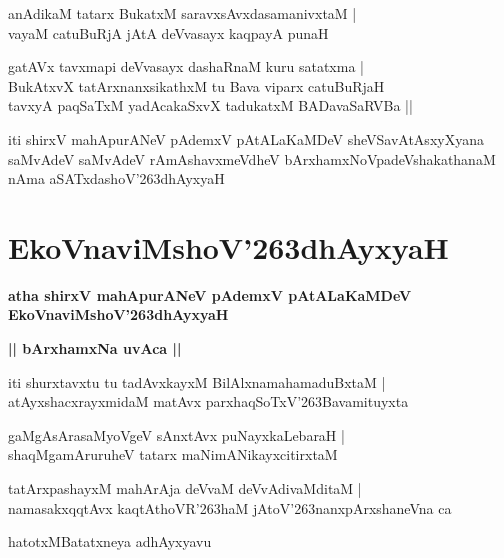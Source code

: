 \documentclass[twoside,12pt,openright]{book}
\def\S{\char'263}
\newcounter{shloka}[chapter]
\def\uvaca#1{\centerline{{\large\textbf{#1}}}}
\begin{document}
\begin{shloka}%
anAdikaM tatarx BukatxM saravxsAvxdasamanivxtaM |\\
vayaM catuBuRjA jAtA deVvasayx kaqpayA punaH 
\end{shloka}

\begin{shloka}%
gatAVx tavxmapi deVvasayx dashaRnaM kuru satatxma |\\
BukAtxvX tatArxnanxsikathxM tu Bava viparx catuBuRjaH \\
tavxyA paqSaTxM yadAcakaSxvX tadukatxM BADavaSaRVBa ||\\
\end{shloka}

\begin{center}
iti shirxV mahApurANeV pAdemxV pAtALaKaMDeV sheVSavAtAsxyXyana saMvAdeV 
saMvAdeV rAmAshavxmeVdheV bArxhamxNoVpadeVshakathanaM nAma aSATxdashoV\S dhAyxyaH
\end{center}

\chapter{EkoVnaviMshoV\S dhAyxyaH}

\begin{center}
{\LARGE\bfseries atha shirxV mahApurANeV pAdemxV pAtALaKaMDeV EkoVnaviMshoV\S dhAyxyaH}
\end{center}

\uvaca{|| bArxhamxNa uvAca ||}

\begin{shloka}%
iti shurxtavxtu tu tadAvxkayxM BilAlxnamahamaduBxtaM |\\
atAyxshacxrayxmidaM matAvx parxhaqSoTxV\S Bavamituyxta
\end{shloka}

\begin{shloka}%
gaMgAsArasaMyoVgeV sAnxtAvx puNayxkaLebaraH |\\
shaqMgamAruruheV tatarx maNimANikayxcitirxtaM
\end{shloka}

\begin{shloka}%
tatArxpashayxM mahArAja deVvaM deVvAdivaMditaM |\\
namasakxqqtAvx kaqtAthoVR\S haM jAtoV\S nanxpArxshaneVna ca 
\end{shloka}

\begin{center}
hatotxMBatatxneya adhAyxyavu
\end{center}
\end{document}
